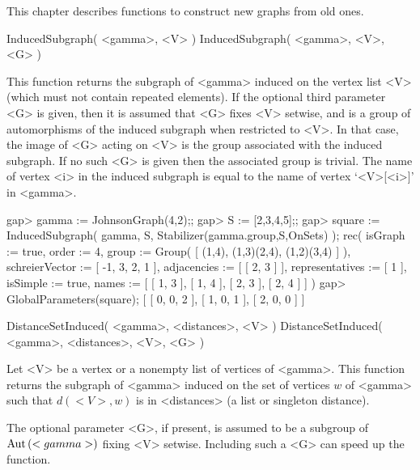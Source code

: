 %
%
%
%
\def\GRAPE{\sf GRAPE}
\def\nauty{\it nauty}
\def\Aut{{\rm Aut}\,}


This chapter describes functions to construct new graphs from old
ones.


\>InducedSubgraph( <gamma>, <V> )
\>InducedSubgraph( <gamma>, <V>, <G> )

This function returns the subgraph of <gamma> induced on the vertex
list <V> (which must not contain repeated elements). If the optional
third parameter <G> is given, then it is assumed that <G> fixes <V>
setwise, and is a group of automorphisms of the induced subgraph when
restricted to <V>. In that case, the image of <G> acting on <V> is the
group associated with the induced subgraph. If no such <G> is given then
the associated group is trivial. The name of vertex <i> in the induced
subgraph is equal to the name of vertex `<V>[<i>]' in <gamma>.

\beginexample
gap> gamma := JohnsonGraph(4,2);;
gap> S := [2,3,4,5];;
gap> square := InducedSubgraph( gamma, S, Stabilizer(gamma.group,S,OnSets) );
rec(
  isGraph := true,
  order := 4,
  group := Group( [ (1,4), (1,3)(2,4), (1,2)(3,4) ] ),
  schreierVector := [ -1, 3, 2, 1 ],
  adjacencies := [ [ 2, 3 ] ],
  representatives := [ 1 ],
  isSimple := true,
  names := [ [ 1, 3 ], [ 1, 4 ], [ 2, 3 ], [ 2, 4 ] ] )
gap> GlobalParameters(square);
[ [ 0, 0, 2 ], [ 1, 0, 1 ], [ 2, 0, 0 ] ]
\endexample


\>DistanceSetInduced( <gamma>, <distances>, <V> )
\>DistanceSetInduced( <gamma>, <distances>, <V>, <G> )

Let <V> be a vertex or a nonempty list of vertices of <gamma>.
This function returns the subgraph of <gamma> induced on the set of
vertices $w$ of <gamma> such that $d(<V>,w)$ is in <distances> (a list
or singleton distance).

The optional  parameter <G>,  if present, is assumed to be a subgroup  of
$\Aut(<gamma>)$  fixing <V> setwise.   Including such a  <G> can speed up
the function.

